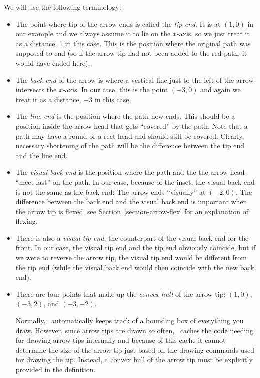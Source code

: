 We will use the following terminology:
%
\begin{itemize}
    \item The point where tip of the arrow ends is called the \emph{tip end}.
        It is at $(1,0)$ in our example and we always assume it to lie on the
        $x$-axis, so we just treat it as a distance, 1 in this case. This is
        the position where the original path was supposed to end (so if the
        arrow tip had not been added to the red path, it would have ended
        here).
    \item The \emph{back end} of the arrow is where a vertical line just to the
        left of the arrow intersects the $x$-axis. In our case, this is the
        point $(-3,0)$ and again we treat it as a distance, $-3$ in this case.
    \item The \emph{line end} is the position where the path now ends. This
        should be a position inside the arrow head that gets ``covered'' by the
        path. Note that a path may have a round or a rect head and should still
        be covered. Clearly, necessary shortening of the path will be the
        difference between the tip end and the line end.
    \item The \emph{visual back end} is the position where the path and the the
        arrow head ``meet last'' on the path. In our case, because of the
        inset, the visual back end is not the same as the back end: The arrow
        ends ``visually'' at $(-2,0)$. The difference between the back end and
        the visual back end is important when the arrow tip is flexed, see
        Section~\ref{section-arrow-flex} for an explanation of flexing.
    \item There is also a \emph{visual tip end}, the counterpart of the visual
        back end for the front. In our case, the visual tip end and the tip end
        obviously coincide, but if we were to reverse the arrow tip, the visual
        tip end would be different from the tip end (while the visual back end
        would then coincide with the new back end).
    \item There are four points that make up the \emph{convex hull} of the
        arrow tip: $(1,0)$, $(-3,2)$, and $(-3,-2)$.

        Normally, \pgfname\ automatically keeps track of a bounding box of
        everything you draw. However, since arrow tips are drawn so often,
        \pgfname\ caches the code needing for drawing arrow tips internally and
        because of this cache it cannot determine the size of the arrow tip
        just based on the drawing commands used for drawing the tip. Instead, a
        convex hull of the arrow tip must be explicitly provided in the
        definition.
\end{itemize}

